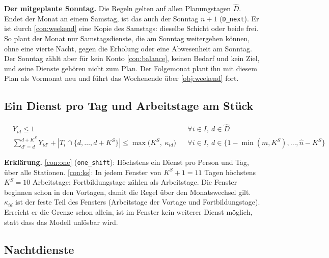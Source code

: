 \documentclass[11pt]{combiArticle}
\newcommand{\code}[1]{\texttt{#1}}
\begin{document}
\textbf{Der mitgeplante Sonntag.} Die Regeln gelten auf allen Planungstagen $\hat D$. Endet der Monat an einem
Samstag, ist das auch der Sonntag $n+1$ (\code{D\_next}). Er ist durch \eqref{con:weekend} eine Kopie des Samstags:
dieselbe Schicht oder beide frei. So plant der Monat nur Samstagsdienste, die am Sonntag weitergehen können, ohne
eine vierte Nacht, gegen die Erholung oder eine Abwesenheit am Sonntag. Der Sonntag zählt aber für kein Konto
\eqref{con:balance}, keinen Bedarf und kein Ziel, und seine Dienste gehören nicht zum Plan. Der Folgemonat plant ihn
mit diesem Plan als Vormonat neu und führt das Wochenende über \eqref{obj:weekend} fort.

\subsection{Ein Dienst pro Tag und Arbeitstage am Stück}

\begin{align}
  & Y_{id} \le 1 && \forall i \in I,\ d \in \hat D \label{con:one}\\
  & \textstyle\sum_{d' = d}^{d + K^{S}} Y_{id'} + |T_i \cap \{d,\dots,d+K^{S}\}| \le \max\bigl(K^{S},\ \kappa_{id}\bigr)
    && \forall i \in I,\ d \in \{1-\min(m,K^{S}),\dots,\hat n-K^{S}\} \label{con:ks}
\end{align}

\textbf{Erklärung.}
\eqref{con:one} (\code{one\_shift}): Höchstens ein Dienst pro Person und Tag, über alle Stationen.
\eqref{con:ks}: In jedem Fenster von $K^{S}+1 = 11$ Tagen höchstens $K^{S} = 10$ Arbeitstage; Fortbildungstage
zählen als Arbeitstage. Die Fenster beginnen schon in den Vortagen, damit die Regel über den Monatswechsel gilt.
$\kappa_{id}$ ist der feste Teil des Fensters (Arbeitstage der Vortage und Fortbildungstage). Erreicht er die
Grenze schon allein, ist im Fenster kein weiterer Dienst möglich, statt dass das Modell unlösbar wird.

\subsection{Nachtdienste}
\end{document}
